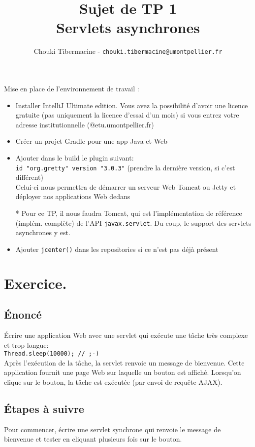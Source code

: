 \documentclass[11pt]{article}
\title{Sujet de TP 1\\
{\large Servlets asynchrones}}
\author{Chouki Tibermacine - \texttt{chouki.tibermacine@umontpellier.fr}}
\date{}
\begin{document}
\maketitle

Mise en place de l'environnement de travail :

\begin{itemize}
  \item Installer IntelliJ Ultimate edition. Vous avez la possibilité d'avoir une licence gratuite (pas uniquement la licence d'essai d'un mois) si vous entrez votre adresse institutionnelle (@etu.umontpellier.fr)
  \item Créer un projet Gradle pour une app Java et Web
  \item Ajouter dans le build le plugin suivant:\\
  \texttt{id "org.gretty" version "3.0.3"} (prendre la dernière version, si c'est différent)\\
  Celui-ci nous permettra de démarrer un serveur Web Tomcat ou Jetty et déployer nos applications Web dedans
  \item[*] Pour ce TP, il nous faudra Tomcat, qui est l'implémentation de référence (implém. complète) de l'API \texttt{javax.servlet}. Du coup, le support des servlets asynchrones y est.
  \item Ajouter \texttt{jcenter()} dans les repositories si ce n'est pas déjà présent
\end{itemize}

\section*{Exercice.} 
\subsection*{Énoncé}
Écrire une application Web avec une servlet qui exécute une tâche très complexe et trop longue:\\ \texttt{Thread.sleep(10000); // ;-)}  \\
Après l'exécution de la tâche, la servlet renvoie un message de bienvenue.
Cette application fournit une page Web sur laquelle un bouton est affiché. Lorsqu'on clique sur le bouton, la tâche est exécutée (par envoi de requête AJAX).

\subsection*{Étapes à suivre}
Pour commencer, écrire une servlet synchrone qui renvoie le message de bienvenue et tester en cliquant plusieurs fois sur le bouton.
\end{document}
